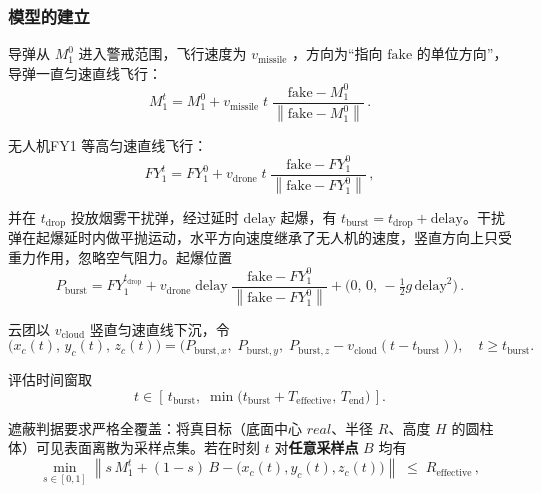 \documentclass[withoutpreface,bwprint]{cumcmthesis} %
\begin{document}
\subsubsection{模型的建立}

导弹从 $M_1^0$ 进入警戒范围，飞行速度为 $v_{\text{missile}}$ ，方向为“指向 $\mathrm{fake}$ 的单位方向”，导弹一直匀速直线飞行：
\begin{equation}
	M_1^{t}
	=
	M_1^0
	+
	v_{\text{missile}}\;t\;
	\frac{\mathrm{fake}-M_1^0}{\left\|\mathrm{fake}-M_1^0\right\|}\, .
\end{equation}

无人机FY1 等高匀速直线飞行：
\begin{equation}
	FY_1^{t}
	=
	FY_1^0
	+
	v_{\text{drone}}\;t\;
	\frac{\mathrm{fake}-FY_1^0}{\left\|\mathrm{fake}-FY_1^0\right\|}\, ,
\end{equation}

并在 $t_{\text{drop}}$ 投放烟雾干扰弹，经过延时 $\text{delay}$ 起爆，有 $t_{\text{burst}}=t_{\text{drop}}+\text{delay}$。干扰弹在起爆延时内做平抛运动，水平方向速度继承了无人机的速度，竖直方向上只受重力作用，忽略空气阻力。起爆位置
\begin{equation}
	\boxed{
		P_{\text{burst}}
		=
		FY_1^{t_{\text{drop}}}
		+
		v_{\text{drone}}\;\text{delay}\;
		\frac{\mathrm{fake}-FY_1^0}{\left\|\mathrm{fake}-FY_1^0\right\|}
		+
		\big(0,\,0,\,-\tfrac{1}{2}g\,\text{delay}^{2}\big)
	}\, .
\end{equation}

云团以 $v_{\text{cloud}}$ 竖直匀速直线下沉，令
\begin{equation}
	\big(x_c(t),\,y_c(t),\,z_c(t)\big)
	=
	\big(P_{\text{burst},x},\;P_{\text{burst},y},\;P_{\text{burst},z}-v_{\text{cloud}}(t-t_{\text{burst}})\big),
	\quad t\ge t_{\text{burst}} .
\end{equation}

评估时间窗取
\begin{equation}
	t \in \left[\,t_{\text{burst}},\;\min\!\big(t_{\text{burst}}+T_{\text{effective}},\,T_{\text{end}}\big)\,\right].
\end{equation}

遮蔽判据要求严格全覆盖：将真目标（底面中心 $real$、半径 $R$、高度 $H$ 的圆柱体）可见表面离散为采样点集。若在时刻 $t$ 对\textbf{任意采样点} $B$ 均有
\begin{equation}
	\boxed{
		\min_{s\in[0,1]}
		\left\|
		s\,M_1^{t}+(1-s)\,B-\big(x_c(t),y_c(t),z_c(t)\big)
		\right\|
		\;\le\;
		R_{\text{effective}}
	}\, ,
\end{equation}
\end{document}
